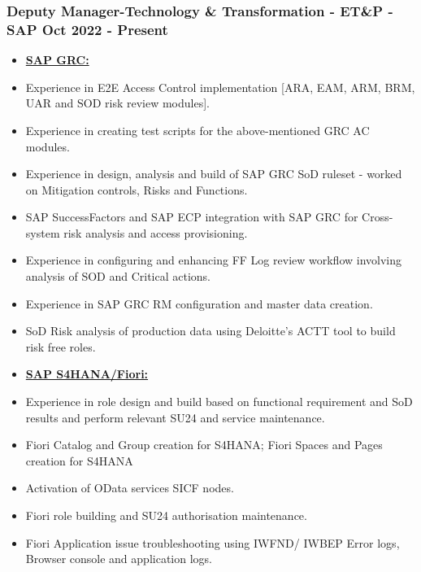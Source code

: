 \documentclass[10pt]{article}
\begin{document}
\subsubsection{Deputy Manager-Technology \& Transformation - ET\&P - SAP \hfill  Oct 2022 - Present \\}
\begin{itemize}
	\small
    	\item[] \textbf{\underline{SAP GRC:}}
			\item Experience in E2E Access Control implementation [ARA, EAM, ARM, BRM, UAR and SOD risk review modules].
			\item Experience in creating test scripts for the above-mentioned GRC AC modules.
			\item Experience in design, analysis and build of SAP GRC SoD ruleset - worked on Mitigation controls, Risks and Functions.
			\item SAP SuccessFactors and SAP ECP integration with SAP GRC for Cross-system risk analysis and access provisioning.
			\item Experience in configuring and enhancing FF Log review workflow involving analysis of SOD and Critical actions.
			\item Experience in SAP GRC RM configuration and master data creation.
			\item SoD Risk analysis of production data using Deloitte's ACTT tool to build risk free roles.
\end{itemize}

\begin{itemize}
	\small
    	\item[] \textbf{\underline{SAP S4HANA/Fiori:}}
			\item Experience in role design and build based on functional requirement and SoD results and perform relevant SU24 and service maintenance.
			\item Fiori Catalog and Group creation for S4HANA; Fiori Spaces and Pages creation for S4HANA
			\item Activation of OData services SICF nodes.
			\item Fiori role building and SU24 authorisation maintenance.
			\item Fiori Application issue troubleshooting using IWFND/ IWBEP Error logs, Browser console and application logs.
\end{itemize}
\end{document}
